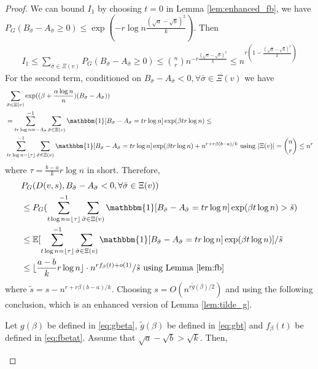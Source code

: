 \documentclass{article}
\begin{document}
\begin{proof}
We can bound $I_1$ by choosing $t=0$ in Lemma \ref{lem:enhanced_fb}, we have
$P_G( B_{\bar{\sigma}} - A_{\bar{\sigma}} \ge 0 ) \leq \exp(-r\log n \frac{(\sqrt{a}-\sqrt{b})^2}{k})$.
Then
\begin{align*}
I_1 \leq \sum_{\bar{\sigma} \in \Xi(v)} P_G( B_{\bar{\sigma}} - A_{\bar{\sigma}} \geq 0) \leq \binom{n}{r} n^{-r\frac{(\sqrt{a}-\sqrt{b})^2}{k}}
\leq n^{r(1-\frac{(\sqrt{a}-\sqrt{b})^2}{k})}
\end{align*}
For the second term,
conditioned on $B_{\bar{\sigma}} - A_{\bar{\sigma}}    < 0, \forall \bar{\sigma} \in \Xi(v)$ we have
\begin{align*}
&\sum_{\bar{\sigma} \in \Xi(v)} \exp ( (\beta + \frac{\alpha \log n}{n})(B_{\bar{\sigma}} - A_{\bar{\sigma}} ) ) \\
& = \sum_{tr\log n = -A_{\bar{\sigma}} }^{-1} \sum_{\bar{\sigma} \in \Xi(v)} \mathbbm{1}[B_{\bar{\sigma}} - A_{\bar{\sigma}}  = tr \log n] \exp ( \beta  tr\log n)\leq \\ 
&
\sum_{tr\log n =\lfloor\tau\rfloor}^{-1} \sum_{\bar{\sigma} \in \Xi(v)}  \mathbbm{1}[B_{\bar{\sigma}} - A_{\bar{\sigma}}  = tr \log n]
\exp ( \beta  tr\log n) + n^{r+r\beta(b-a)/k} \textrm{ using } |\Xi(v)| = \binom{n}{r} \leq n^r
\end{align*}
where $\tau =\frac{b-a}{k}r\log n$ in short. Therefore,
\begin{align*}
&P_G(D(v,s), B_{\bar{\sigma}} - A_{\bar{\sigma}}  < 0, \forall \bar{\sigma} \in \Xi(v))  \\
&\leq P_G(\sum_{t\log n =\lfloor\tau\rfloor}^{-1}\sum_{\bar{\sigma} \in \Xi(v)} \mathbbm{1}[B_{\bar{\sigma}} - A_{\bar{\sigma}} = tr\log n]\exp ( \beta  t\log n)  > \tilde{s} ) \\
& \leq \mathbb{E}[\sum_{t\log n =\lfloor\tau\rfloor}^{-1}\sum_{\bar{\sigma} \in \Xi(v)} \mathbbm{1}[B_{\bar{\sigma}} - A_{\bar{\sigma}} = tr\log n]\exp ( \beta  t\log n)] /  \tilde{s} \\
& \leq \lfloor\frac{a-b}{k}r\log n\rfloor \cdot n^{rf_{\beta}(t) + o(1)} / \tilde{s} \textrm{ using Lemma \ref{lem:fb} }
\end{align*}
where $\tilde{s} = s - n^{r+r\beta(b-a)/k}$. 
Choosing $s = O(n^{r\tilde{g}(\beta)/2})$ and using the following conclusion, which is an enhanced version of Lemma
\ref{lem:tilde_g}.
\begin{lemma} \label{lm:ele}
Let $g(\beta)$ be defined in \eqref{eq:gbeta}, $\tilde{g}(\beta)$ be defined in \eqref{eq:gbt} and $f_{\beta}(t)$ be defined in \eqref{eq:fbetat}. Assume that $\sqrt{a}-\sqrt{b}>\sqrt{k}$.
Then,


\end{lemma}
\end{proof}
\end{document}
